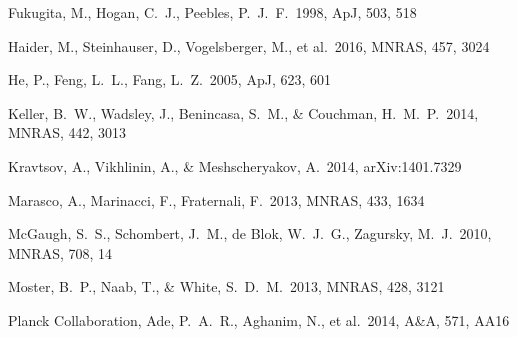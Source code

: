 \documentclass[useAMS,usenatbib]{mn2e}
\def \apj {ApJ}
\def \mnras {MNRAS}
\def \aap {A\&A}
\begin{document}
\begin{thebibliography}{}

    

 Fukugita, M., Hogan, C.~J., Peebles, P.~J.~F.\ 1998, \apj, 503, 518




Haider, M., Steinhauser, D., Vogelsberger, M., et al.\ 2016, \mnras, 457, 3024

He, P., Feng, L.~L., Fang, L.~Z.\ 2005, \apj, 623, 601




 Keller, B.~W., Wadsley, 
  J., Benincasa, S.~M., \& Couchman, H.~M.~P.\ 2014, \mnras, 442, 3013

 Kravtsov, A., 
Vikhlinin, A., \& Meshscheryakov, A.\ 2014, arXiv:1401.7329 

  



Marasco, A., Marinacci, F., Fraternali, F.\ 2013, \mnras, 433, 1634

 McGaugh, S.~S., 
Schombert, J.~M., de Blok, W.~J.~G., Zagursky, M.~J.\ 2010, \mnras,
708, 14

 Moster, B.~P., Naab, T., 
\& White, S.~D.~M.\ 2013, \mnras, 428, 3121 







  Planck Collaboration, Ade, P.~A.~R., Aghanim, N., et al.\ 2014,
  \aap, 571, AA16 
 

\end{thebibliography}
\end{document}
